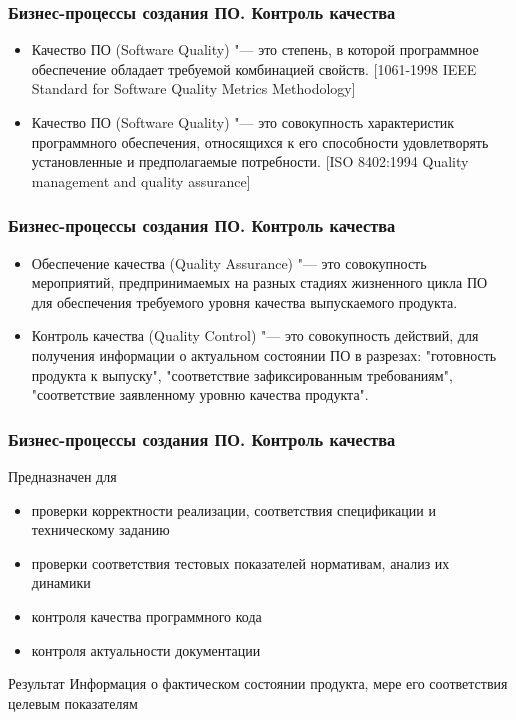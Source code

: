 \documentclass{../industrial-development}
\begin{document}
\begin{frame} \frametitle{Бизнес-процессы создания ПО. Контроль качества}
	\begin{itemize}
		\item Качество ПО (Software Quality) "--- это степень, в которой программное обеспечение обладает требуемой комбинацией свойств. [1061-1998 IEEE Standard for Software Quality Metrics Methodology]
		\item Качество ПО (Software Quality) "--- это совокупность характеристик программного обеспечения, относящихся к его способности удовлетворять установленные и предполагаемые потребности. [ISO 8402:1994 Quality management and quality assurance]
	\end{itemize}
\end{frame}
\lecturenotes


\begin{frame} \frametitle{Бизнес-процессы создания ПО. Контроль качества}
	\begin{itemize}
		\item Обеспечение качества (Quality Assurance) "--- это совокупность мероприятий, предпринимаемых на разных стадиях жизненного цикла ПО для обеспечения требуемого уровня качества выпускаемого продукта.
		\item Контроль качества (Quality Control) "--- это совокупность действий, для получения информации о актуальном состоянии ПО в разрезах: "готовность продукта к выпуску", "соответствие зафиксированным требованиям", "соответствие заявленному уровню качества продукта".
	\end{itemize}
\end{frame}
\lecturenotes


\begin{frame} \frametitle{Бизнес-процессы создания ПО. Контроль качества}
	\begin{block}{Предназначен для}
		\begin{itemize}
			\item проверки корректности реализации, соответствия спецификации и техническому заданию
			\item проверки соответствия тестовых показателей нормативам, анализ их динамики
			\item контроля качества программного кода
			\item контроля актуальности документации
		\end{itemize}
	\end{block}
	\begin{block}{Результат}
		Информация о фактическом состоянии продукта, мере его соответствия целевым показателям
	\end{block}
\end{frame}
\lecturenotes
\end{document}
